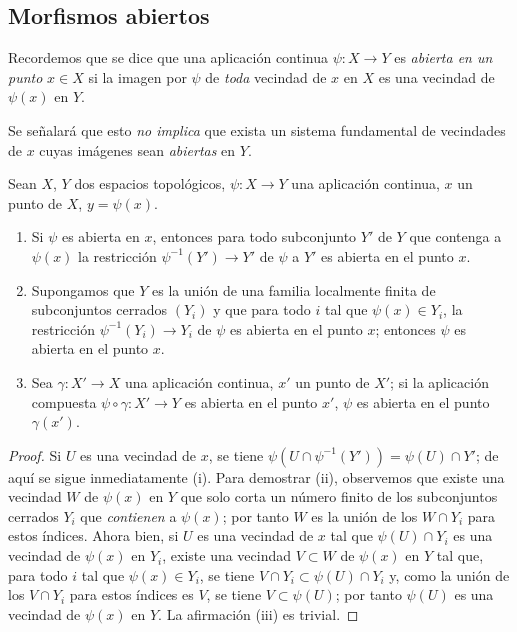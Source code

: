 \subsection{Morfismos abiertos}
\label{subsection:IV.14.1}

\begin{env}[14.1.1]
\label{IV.14.1.1}
Recordemos  que se dice que una aplicación continua $\psi:X\to Y$ es \emph{abierta en un punto} $x\in X$ si la imagen por $\psi$ de \emph{toda} vecindad de $x$ en $X$ es una vecindad de $\psi(x)$ en $Y$.

Se señalará que esto \emph{no implica} que exista un sistema fundamental de vecindades de $x$ cuyas imágenes sean \emph{abiertas} en $Y$.
\end{env}

\begin{proposition}[14.1.2]
\label{IV.14.1.2}
Sean $X$, $Y$ dos espacios topológicos, $\psi:X\to Y$ una aplicación continua, $x$ un punto de $X$, $y=\psi(x)$.
\begin{enumerate}[label=(\roman*)]
  \item Si $\psi$ es abierta en $x$, entonces para todo subconjunto $Y'$ de $Y$ que contenga a $\psi(x)$ la restricción $\psi^{-1}(Y')\to Y'$ de $\psi$ a $Y'$ es abierta en el punto $x$.
  \item Supongamos que $Y$ es la unión de una familia localmente finita de subconjuntos cerrados $(Y_i)$ y que para todo $i$ tal que $\psi(x)\in Y_i$, la restricción $\psi^{-1}(Y_i)\to Y_i$ de $\psi$ es abierta en el punto $x$; entonces $\psi$ es abierta en el punto $x$.
  \item Sea $\gamma:X'\to X$ una aplicación continua, $x'$ un punto de $X'$; si la aplicación compuesta $\psi\circ\gamma:X'\to Y$ es abierta en el punto $x'$, $\psi$ es abierta en el punto $\gamma(x')$.
\end{enumerate}
\end{proposition}

\begin{proof}
Si $U$ es una vecindad de $x$, se tiene $\psi(U\cap\psi^{-1}(Y'))=\psi(U)\cap Y'$; de aquí se sigue inmediatamente (i).
Para demostrar (ii), observemos que existe una vecindad $W$ de $\psi(x)$ en $Y$ que solo corta un número finito de los subconjuntos cerrados $Y_i$ que \emph{contienen} a $\psi(x)$; por tanto $W$ es la unión de los $W\cap Y_i$ para estos índices.
Ahora bien, si $U$ es una vecindad de $x$ tal que $\psi(U)\cap Y_i$ es una vecindad de $\psi(x)$ en $Y_i$, existe una vecindad $V\subset W$ de $\psi(x)$ en $Y$ tal que, para todo $i$ tal que $\psi(x)\in Y_i$,
se tiene $V\cap Y_i\subset\psi(U)\cap Y_i$ y, como la unión de los $V\cap Y_i$ para estos índices es $V$, se tiene $V\subset\psi(U)$; por tanto $\psi(U)$ es una vecindad de $\psi(x)$ en $Y$.
La afirmación (iii) es trivial.
\end{proof}

